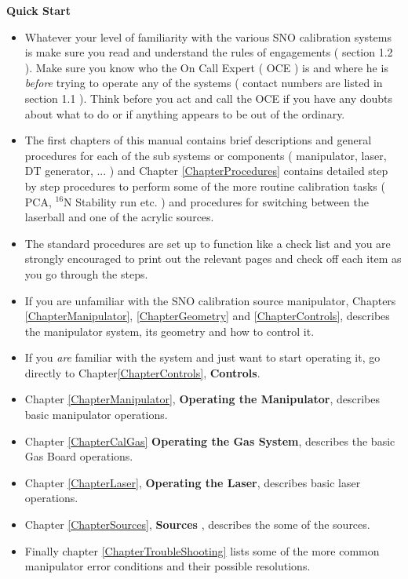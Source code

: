 \documentclass[]{report}
\begin{document}
\newpage


\begin{center}
  {\Large\bf Quick Start}
\end{center}  



\begin{itemize}


\item Whatever your level of familiarity with the various SNO calibration
systems is make sure you read and understand the rules of engagements 
( section 1.2 ). Make sure you know who the On Call Expert ( OCE ) is
and where he is {\em before} trying to operate any of the systems ( contact numbers are listed
in section 1.1 ). Think before you act and call the OCE if you have any doubts about what to do
or if anything appears to be out of the ordinary. 


\item The first chapters of this manual contains brief descriptions and
general procedures for each of the sub systems or components ( manipulator,
laser, DT generator, ... ) and Chapter \ref{ChapterProcedures} contains detailed step by step
procedures to perform some of the more routine calibration tasks ( PCA,
$^{16}$N Stability run etc. ) and procedures for  switching between the laserball and one
of the acrylic sources. 

\item The standard procedures are set up to function like a check list and you are
strongly encouraged to print out the relevant pages and check off each item
as you go through the steps.


\item If you are  unfamiliar with the SNO calibration source manipulator,
Chapters \ref{ChapterManipulator}, \ref{ChapterGeometry} and \ref{ChapterControls},
describes the manipulator system, its geometry and how to control it.
  
\item If you {\em are} familiar with the system and just want to start 
  operating it, go directly to Chapter\ref{ChapterControls}, {\bf Controls}.
 

\item Chapter \ref{ChapterManipulator}, {\bf Operating the Manipulator}, 
  describes basic manipulator operations.
  
  
\item Chapter \ref{ChapterCalGas} {\bf Operating the Gas System},
 describes the basic Gas Board operations.

\item Chapter \ref{ChapterLaser}, {\bf Operating the Laser},
  describes basic laser operations.

\item Chapter \ref{ChapterSources}, {\bf Sources }, describes the some of the sources.

\item Finally chapter \ref{ChapterTroubleShooting} lists some of the more common manipulator
error conditions and their possible resolutions.

\end{itemize}
\end{document}
